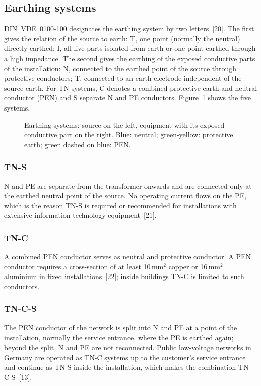 \subsection{Earthing systems}
\label{sec:de-earthing}

DIN~VDE~0100-100 designates the earthing system by two
letters~[20]. The first gives the relation of the source to
earth: T, one point (normally the neutral) directly earthed; I, all live
parts isolated from earth or one point earthed through a high impedance. The
second gives the earthing of the exposed conductive parts of the
installation: N, connected to the earthed point of the source through
protective conductors; T, connected to an earth electrode independent of
the source earth. For TN systems, C denotes a combined protective earth and
neutral conductor (PEN) and S separate N and PE conductors.
Figure~\ref{fig:de-earthing} shows the five systems.

\begin{figure}[!ht]
  \centering
  
  \caption{Earthing systems: source on the left, equipment with its exposed
  conductive part on the right. Blue: neutral; green-yellow: protective
  earth; green dashed on blue: PEN.}
  \label{fig:de-earthing}
\end{figure}

\subsubsection{TN-S}
N and PE are separate from the transformer onwards and are connected only
at the earthed neutral point of the source. No operating current flows on
the PE, which is the reason TN-S is required or recommended for
installations with extensive information technology
equipment~[21].

\subsubsection{TN-C}
A combined PEN conductor serves as neutral and protective conductor. A PEN
conductor requires a cross-section of at least 10\,mm$^2$ copper or
16\,mm$^2$ aluminium in fixed installations~[22]; inside
buildings TN-C is limited to such conductors.

\subsubsection{TN-C-S}
The PEN conductor of the network is split into N and PE at a point of the
installation, normally the service entrance, where the PE is earthed again;
beyond the split, N and PE are not reconnected. Public low-voltage networks
in Germany are operated as TN-C systems up to the customer's service
entrance and continue as TN-S inside the installation, which makes the
combination TN-C-S~[13].

